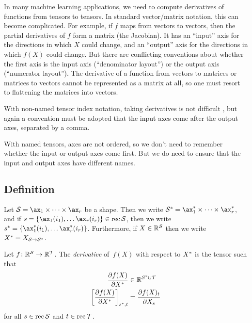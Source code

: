
In many machine learning applications, we need to compute derivatives of functions from tensors to tensors. In standard vector/matrix notation, this can become complicated.
For example, if $f$ maps from vectors to vectors, then the partial derivatives of $f$ form a matrix (the Jacobian). It has an ``input'' axis for the directions in which $X$ could change, and an ``output'' axis for the directions in which $f(X)$ could change.
But there are conflicting conventions about whether the first axis is the input axis (``denominator layout'') or the output axis (``numerator layout''). The derivative of a function from vectors to matrices or matrices to vectors cannot be represented as a matrix at all, so one must resort to flattening the matrices into vectors.

With non-named tensor index notation, taking derivatives is not difficult \citep{laue+:2018}, but again a convention must be adopted that the input axes come after the output axes, separated by a comma.

With named tensors, axes are not ordered, so we don't need to remember whether the input or output axes come first. But we do need to ensure that the input and output axes have different names.

\subsection{Definition}

\begin{definition}
Let $\mathcal{S} = \ax_1 \times \cdots \times \ax_r$ be a shape. Then we write $\mathcal{S\inax} = \ax_1\inax \times \cdots \times \ax_r\inax$, and if $s = \{\ax_1(i_1), \ldots \ax_r(i_r)\} \in \rec \mathcal{S}$, then we write $s\inax = \{\ax_1\inax(i_1), \ldots \ax_r\inax(i_r)\}$. Furthermore, if $X \in \mathbb{R}^\mathcal{S}$ then we write $X^* = X_{\mathcal{S}\rightarrow\mathcal{S}^*}$.
\end{definition}

\begin{definition}
Let $f \colon \mathbb{R}^\mathcal{S} \rightarrow \mathbb{R}^\mathcal{T}$. The \emph{derivative} of~$f(X)$ with respect to $X^*$  
is the tensor such that
\begin{align*}
  \frac{\partial f(X)}{\partial X^*} &\in \mathbb{R}^{\mathcal{S}^* \cup \mathcal{T}} \\
  \left[\frac{\partial f(X)}{\partial X^*} \right]_{s^*,t} &= \frac{\partial f(X)_t}{\partial X_s}
\end{align*}
for all $s \in \operatorname{rec}\mathcal{S}$ and $t \in \operatorname{rec}\mathcal{T}$.
\end{definition}

